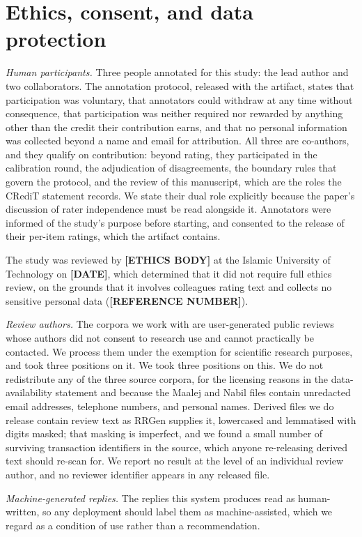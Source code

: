 \documentclass[preprint,12pt]{elsarticle}
\begin{document}
\section*{Ethics, consent, and data protection}
\emph{Human participants.} Three people annotated for this study: the lead author and two
collaborators. The annotation protocol, released with the artifact, states that participation was
voluntary, that annotators could withdraw at any time without consequence, that participation was
neither required nor rewarded by anything other than the credit their contribution earns, and that
no personal information was collected beyond a name and email for attribution. All three are
co-authors, and they qualify on contribution: beyond rating, they participated in the calibration
round, the adjudication of disagreements, the boundary rules that govern the protocol, and the
review of this manuscript, which are the roles the CRediT statement records. We state their dual
role explicitly because the paper's discussion of rater independence must be read alongside it.
Annotators were informed of the study's purpose before starting, and consented to the release of
their per-item ratings, which the artifact contains.

The study was reviewed by \textbf{[ETHICS BODY]} at the Islamic University of Technology on
\textbf{[DATE]}, which determined that it did not require full ethics review, on the grounds that
it involves colleagues rating text and collects no sensitive personal data
(\textbf{[REFERENCE NUMBER]}).

\emph{Review authors.} The corpora we work with are user-generated public reviews whose authors did not consent to
research use and cannot practically be contacted. We process them under the exemption for
scientific research purposes, and took three positions on it. We took three positions on
this. We do not redistribute any of the three source corpora, for the licensing reasons in the
data-availability statement and because the Maalej and Nabil files contain unredacted email
addresses, telephone numbers, and personal names. Derived files we do release contain review text
as RRGen supplies it, lowercased and lemmatised with digits masked; that masking is imperfect, and
we found a small number of surviving transaction identifiers in the source, which anyone
re-releasing derived text should re-scan for. We report no result at the level of an individual
review author, and no reviewer identifier appears in any released file.

\emph{Machine-generated replies.} The replies this system produces read as human-written, so any
deployment should label them as machine-assisted, which we regard as a condition of use rather
than a recommendation.
\end{document}
